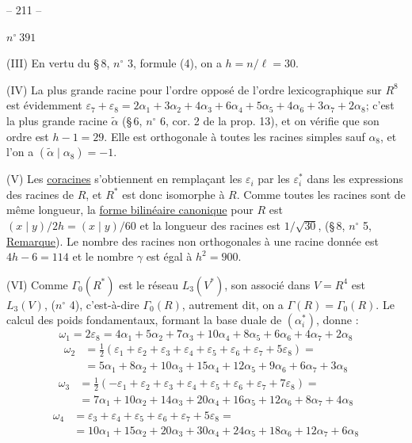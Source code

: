 \begin{center}-- 211 --\end{center}
\begin{flushright}$n^\circ\ 391$\end{flushright}

(III) En vertu du \S\,8, $n^\circ$ 3, formule (4), on a $h=n/\ell=30$.

(IV) La plus grande racine pour l'ordre opposé de l'ordre lexicographique sur $R^8$ est évidemment $\varepsilon_7+\varepsilon_8=2\alpha_1+3\alpha_2+4\alpha_3+6\alpha_4+5\alpha_5+4\alpha_6+3\alpha_7+2\alpha_8$; c'est la plus grande racine $\widetilde\alpha$ (\S\,6, $n^\circ$ 6, cor. 2 de la prop. 13), et on vérifie que son ordre est $h-1=29$. Elle est orthogonale à toutes les racines simples sauf $\alpha_8$, et l'on a $(\widetilde\alpha\mid\alpha_8)=-1$.

(V) Les \uline{coracines} s'obtiennent en remplaçant les $\varepsilon_i$ par les $\varepsilon_i^*$ dans les expressions des racines de $R$, et $R^*$ est donc isomorphe à $R$. Comme toutes les racines sont de même longueur, la \uline{forme bilinéaire canonique} pour $R$ est $(x\mid y)/2h=(x\mid y)/60$ et la longueur des racines est $1/\sqrt{30}$, (\S\,8, $n^\circ$ 5, \uline{Remarque}). Le nombre des racines non orthogonales à une racine donnée est $4h-6=114$ et le nombre $\gamma$ est égal à $h^2=900$.

(VI) Comme $\Gamma_0(R^*)$ est le réseau $L_3(V^*)$, son associé dans $V=R^4$ est $L_3(V)$, ($n^\circ$ 4), c'est-à-dire $\Gamma_0(R)$, autrement dit, on a $\Gamma(R)=\Gamma_0(R)$. Le calcul des poids fondamentaux, formant la base duale de $(\alpha_i^*)$, donne :
\[
\omega_1=2\varepsilon_8=4\alpha_1+5\alpha_2+7\alpha_3+10\alpha_4+8\alpha_5+6\alpha_6+4\alpha_7+2\alpha_8
\]
\[
\begin{aligned}
\omega_2&=\tfrac12(\varepsilon_1+\varepsilon_2+\varepsilon_3+\varepsilon_4+\varepsilon_5+\varepsilon_6+\varepsilon_7+5\varepsilon_8)=\\
&=5\alpha_1+8\alpha_2+10\alpha_3+15\alpha_4+12\alpha_5+9\alpha_6+6\alpha_7+3\alpha_8
\end{aligned}
\]
\[
\begin{aligned}
\omega_3&=\tfrac12(-\varepsilon_1+\varepsilon_2+\varepsilon_3+\varepsilon_4+\varepsilon_5+\varepsilon_6+\varepsilon_7+7\varepsilon_8)=\\
&=7\alpha_1+10\alpha_2+14\alpha_3+20\alpha_4+16\alpha_5+12\alpha_6+8\alpha_7+4\alpha_8
\end{aligned}
\]
\[
\begin{aligned}
\omega_4&=\varepsilon_3+\varepsilon_4+\varepsilon_5+\varepsilon_6+\varepsilon_7+5\varepsilon_8=\\
&=10\alpha_1+15\alpha_2+20\alpha_3+30\alpha_4+24\alpha_5+18\alpha_6+12\alpha_7+6\alpha_8
\end{aligned}
\]
